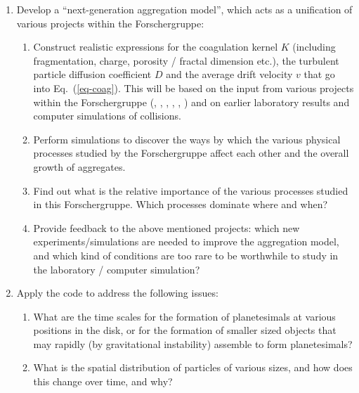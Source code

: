 \begin{enumerate}
\item Develop a ``next-generation aggregation model'', which acts as a
unification of various projects within the Forschergruppe:
\begin{enumerate}
\item Construct realistic expressions for the coagulation kernel $K$ 
(including fragmentation, charge, porosity / fractal dimension etc.), the
turbulent particle diffusion coefficient $D$ and the average drift velocity
$v$ that go into Eq.~(\ref{eq-coag}). This will be based on the input from
various projects within the Forschergruppe (\projblum{}, \projwurm{},
\projblumtrie{}, \projkley{}, \projklahr{}, \projtscharn) and on earlier
laboratory results and computer simulations of collisions.
\item Perform simulations to discover the ways by which the various physical
processes studied by the Forschergruppe affect each other and the overall 
growth of aggregates.
\item Find out what is the relative importance of the various processes 
studied in this Forschergruppe. Which processes dominate where and when?
\item Provide feedback to the above mentioned projects: which new
experiments/simulations are needed to improve the aggregation model, and
which kind of conditions are too rare to be worthwhile to study in the
laboratory / computer simulation?
\end{enumerate}
\item Apply the code to address the following issues:
\begin{enumerate}
\item What are the time scales for the formation of planetesimals at
various positions in the disk, or for
the formation of smaller sized objects that may rapidly (by gravitational
instability) assemble to form planetesimals?
\item What is the spatial distribution of particles of various sizes, and
how does this change over time, and why?

\end{enumerate}
\end{enumerate}
